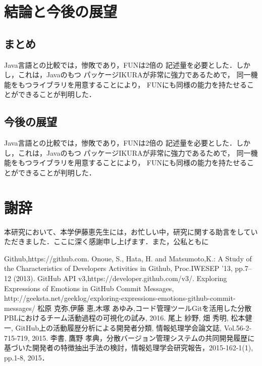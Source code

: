\documentclass{funthesis}
\begin{document}

\chapter{結論と今後の展望}

\section{まとめ}

Java言語との比較では，惨敗であり，FUNは2倍の
記述量を必要とした．しかし，これは，Javaのもつ
パッケージIKURAが非常に強力であるためで，
同一機能をもつライブラリを用意することにより，
FUNにも同様の能力を持たせることができることが判明した．

\section{今後の展望}

Java言語との比較では，惨敗であり，FUNは2倍の
記述量を必要とした．しかし，これは，Javaのもつ
パッケージIKURAが非常に強力であるためで，
同一機能をもつライブラリを用意することにより，
FUNにも同様の能力を持たせることができることが判明した．


\chapter*{謝辞}

本研究において、本学伊藤恵先生には，お忙しい中，研究に関する助言をしていただきました．ここに深く感謝申し上げます．また，公私ともに
\begin{thebibliography}{20}
  Github,https://github.com.
  Onoue, S., Hata, H. and Matsumoto,K.: A Study of the Characteristics of Developers Activities in Github, Proc.IWESEP ’13, pp.7–12 (2013).
 GitHub API v3,https://developer.github.com/v3/.
 Exploring　Expressions of Emotions in GitHub Commit Messages,
\\ http://geeksta.net/geeklog/exploring-expressions-emotions-github-commit-messages/
  松原 克弥,伊藤 恵,木塚 あゆみ,コード管理ツールGitを活用した分散PBLにおけるチーム活動過程の可視化の試み, 2016.
  尾上 紗野, 畑 秀明, 松本健一, GitHub上の活動履歴分析による開発者分類, 情報処理学会論文誌, Vol.56-2-715-719, 2015.
 李書, 鷹野 孝典，分散バージョン管理システムの共同開発履歴に基づいた開発者の特徴抽出手法の検討，情報処理学会研究報告，2015-162-1(1), pp.1-8, 2015．
\end{thebibliography}
\end{document}

